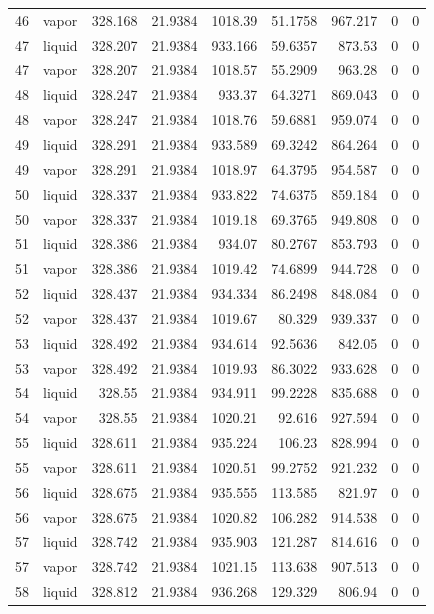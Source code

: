 \begin{longtable}{r l r r r r r r r}
46 & vapor & 328.168 & 21.9384 & 1018.39 & 51.1758 & 967.217 & 0 & 0 \\
47 & liquid & 328.207 & 21.9384 & 933.166 & 59.6357 & 873.53 & 0 & 0 \\
47 & vapor & 328.207 & 21.9384 & 1018.57 & 55.2909 & 963.28 & 0 & 0 \\
48 & liquid & 328.247 & 21.9384 & 933.37 & 64.3271 & 869.043 & 0 & 0 \\
48 & vapor & 328.247 & 21.9384 & 1018.76 & 59.6881 & 959.074 & 0 & 0 \\
49 & liquid & 328.291 & 21.9384 & 933.589 & 69.3242 & 864.264 & 0 & 0 \\
49 & vapor & 328.291 & 21.9384 & 1018.97 & 64.3795 & 954.587 & 0 & 0 \\
50 & liquid & 328.337 & 21.9384 & 933.822 & 74.6375 & 859.184 & 0 & 0 \\
50 & vapor & 328.337 & 21.9384 & 1019.18 & 69.3765 & 949.808 & 0 & 0 \\
51 & liquid & 328.386 & 21.9384 & 934.07 & 80.2767 & 853.793 & 0 & 0 \\
51 & vapor & 328.386 & 21.9384 & 1019.42 & 74.6899 & 944.728 & 0 & 0 \\
52 & liquid & 328.437 & 21.9384 & 934.334 & 86.2498 & 848.084 & 0 & 0 \\
52 & vapor & 328.437 & 21.9384 & 1019.67 & 80.329 & 939.337 & 0 & 0 \\
53 & liquid & 328.492 & 21.9384 & 934.614 & 92.5636 & 842.05 & 0 & 0 \\
53 & vapor & 328.492 & 21.9384 & 1019.93 & 86.3022 & 933.628 & 0 & 0 \\
54 & liquid & 328.55 & 21.9384 & 934.911 & 99.2228 & 835.688 & 0 & 0 \\
54 & vapor & 328.55 & 21.9384 & 1020.21 & 92.616 & 927.594 & 0 & 0 \\
55 & liquid & 328.611 & 21.9384 & 935.224 & 106.23 & 828.994 & 0 & 0 \\
55 & vapor & 328.611 & 21.9384 & 1020.51 & 99.2752 & 921.232 & 0 & 0 \\
56 & liquid & 328.675 & 21.9384 & 935.555 & 113.585 & 821.97 & 0 & 0 \\
56 & vapor & 328.675 & 21.9384 & 1020.82 & 106.282 & 914.538 & 0 & 0 \\
57 & liquid & 328.742 & 21.9384 & 935.903 & 121.287 & 814.616 & 0 & 0 \\
57 & vapor & 328.742 & 21.9384 & 1021.15 & 113.638 & 907.513 & 0 & 0 \\
58 & liquid & 328.812 & 21.9384 & 936.268 & 129.329 & 806.94 & 0 & 0 \\

\end{longtable}
